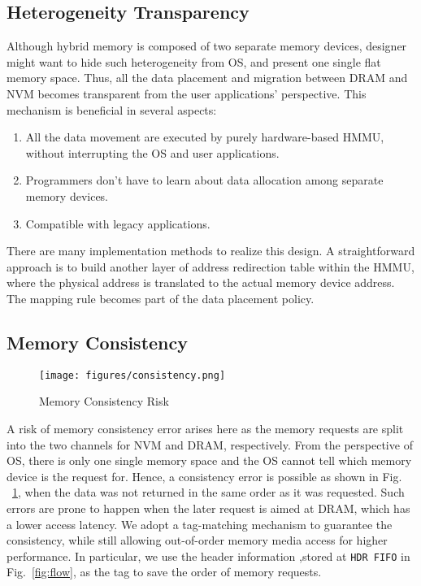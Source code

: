 \documentclass[conference]{IEEEtran}
\begin{document}
\subsection{Heterogeneity Transparency}
Although hybrid memory is composed of two separate memory devices, designer might want to hide such heterogeneity from OS, and present one single flat memory space. Thus, all the data placement and migration between DRAM and NVM becomes transparent from the user applications' perspective. This mechanism is beneficial in several aspects:
\begin{enumerate}
    \item All the data movement are executed by purely hardware-based HMMU, without interrupting the OS and user applications.
    \item Programmers don't have to learn about data allocation among separate memory devices.
    \item Compatible with legacy applications.
\end{enumerate}
There are many implementation methods to realize this design. A straightforward approach is to build another layer of address redirection table within the HMMU, where the physical address is translated to the actual memory device address. The mapping rule becomes part of the data placement policy.
\subsection{Memory Consistency}
\begin{figure}[h]
\centerline{\texttt{[image: figures/consistency.png]}}
\caption{Memory Consistency Risk}
\label{fig:consistency}
\end{figure}

A risk of memory consistency error arises here as the memory requests are split into the two channels for NVM and DRAM, respectively. From the perspective of OS, there is only one single memory space and the OS cannot tell which memory device is the request for. Hence, a consistency error is possible as shown in Fig. ~\ref{fig:consistency}, when the data was not returned in the same order as it was requested. Such errors are prone to happen when the later request is aimed at DRAM, which has a lower access latency. We adopt a tag-matching mechanism to guarantee the consistency, while still allowing out-of-order memory media access for higher performance. In particular, we use the header information ,stored at \texttt{HDR FIFO} in Fig.~\ref{fig:flow}, as the tag to save the order of memory requests.
\end{document}
